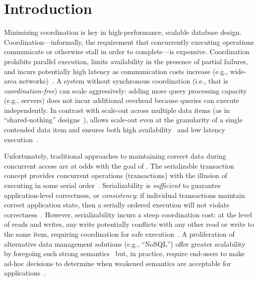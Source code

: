 
\section{Introduction}
\label{sec:intro}


Minimizing coordination is key in high-performance, scalable database
design. Coordination---informally, the requirement that concurrently
executing operations communicate or otherwise stall in order to
complete---is expensive. Coordination prohibits parallel execution,
limits availability in the presence of partial failures, and incurs
potentially high latency as communication costs increase (e.g.,
wide-area networks)~\cite{hat-vldb,gilbert-cap}. A system without
synchronous coordination (i.e., that is \textit{coordination-free})
can scale aggressively: adding more query processing capacity (e.g.,
servers) does not incur additional overhead because queries can
execute independently. In contrast with scale-out across multiple data
items (as in ``shared-nothing''
designs~\cite{bernstein-book,f1,spanner,pnuts,hstore}), \cfreedom
allows scale-out even at the granularity of a single contended data
item and ensures both high availability~\cite{gilbert-cap} and low
latency execution~\cite{pacelc}.


Unfortunately, traditional approaches to maintaining correct data
during concurrent access are at odds with the goal of \cfreedom. The
serializable transaction concept provides concurrent operations
(transactions) with the illusion of executing in some serial
order~\cite{bernstein-book}. Serializability is \textit{sufficient} to
guarantee application-level correctness, or \textit{consistency}: if
individual transactions maintain correct application state, then a
serially ordered execution will not violate
correctness~\cite{gray-virtues}. However, serializability incurs a
steep coordination cost: at the level of reads and writes, any write
potentially conflicts with any other read or write to the same item,
requiring coordination for safe
execution~\cite{hat-vldb,davidson-survey}. A proliferation of
alternative data management solutions (e.g., ``NoSQL'') offer greater
scalability by foregoing such strong
semantics~\cite{dynamo,optimistic} but, in practice, require end-users
to make ad-hoc decisions to determine when weakened semantics are
acceptable for applications~\cite{consistency-borders}.

